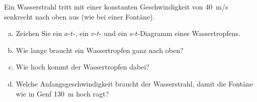 
\begin{aufgabe}
Ein Wasserstrahl tritt mit einer konstanten Geschwindigkeit von
\SI{40}{m/s} senkrecht nach oben aus (wie bei einer Fontäne).
\begin{enumerate}[a)]
	\item Zeichen Sie ein $a$-$t$-, ein $v$-$t$- und ein $s$-$t$-Diagramm eines Wassertropfens.
	\item Wie lange braucht ein Wassertropfen ganz nach oben?
	\item Wie hoch kommt der Wassertropfen dabei?
	\item Welche Anfangsgeschwindigkeit braucht der Wasserstrahl, damit die Fontäne wie in Genf \SI{130}{m} hoch ragt?
\end{enumerate}
\end{aufgabe}


